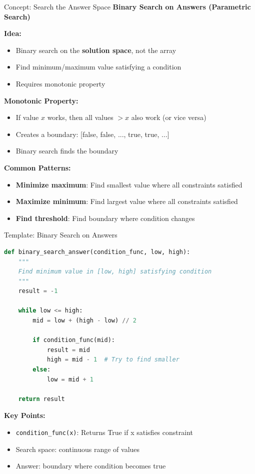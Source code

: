 \documentclass[aspectratio=169]{beamer}
\begin{document}
\begin{frame}{Concept: Search the Answer Space}
  \textbf{Binary Search on Answers (Parametric Search)}

  \vspace{0.3cm}
  \textbf{Idea:}
  \begin{itemize}
    \item Binary search on the \textbf{solution space}, not the array
    \item Find minimum/maximum value satisfying a condition
    \item Requires monotonic property
  \end{itemize}

  \vspace{0.3cm}
  \textbf{Monotonic Property:}
  \begin{itemize}
    \item If value $x$ works, then all values $> x$ also work (or vice versa)
    \item Creates a boundary: [false, false, ..., true, true, ...]
    \item Binary search finds the boundary
  \end{itemize}

  \vspace{0.3cm}
  \textbf{Common Patterns:}
  \begin{itemize}
    \item \textbf{Minimize maximum}: Find smallest value where all constraints satisfied
    \item \textbf{Maximize minimum}: Find largest value where all constraints satisfied
    \item \textbf{Find threshold}: Find boundary where condition changes
  \end{itemize}
\end{frame}

\begin{frame}[fragile]{Template: Binary Search on Answers}
\begin{lstlisting}[language=Python, basicstyle=\ttfamily\small]
def binary_search_answer(condition_func, low, high):
    """
    Find minimum value in [low, high] satisfying condition
    """
    result = -1

    while low <= high:
        mid = low + (high - low) // 2

        if condition_func(mid):
            result = mid
            high = mid - 1  # Try to find smaller
        else:
            low = mid + 1

    return result
\end{lstlisting}

\textbf{Key Points:}
\begin{itemize}
  \item \texttt{condition\_func(x)}: Returns True if x satisfies constraint
  \item Search space: continuous range of values
  \item Answer: boundary where condition becomes true
\end{itemize}
\end{frame}
\end{document}
